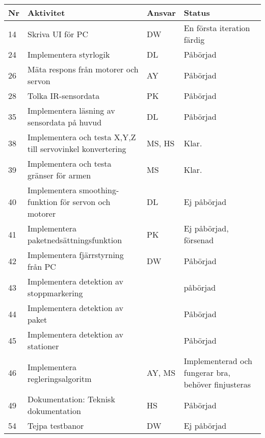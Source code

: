 \documentclass[titlepage, a4paper]{article}
\begin{document}
\newpage
\begin{center}
\begin{tabularx}{\textwidth}{| p{4mm} | X | p{13.5mm} | X |}
	\hline
	\textbf{Nr} & \textbf{Aktivitet} & \textbf{Ansvar} & \textbf{Status} \\\hline
	{14} & {Skriva UI för PC} & {DW} & {En första iteration färdig} \\\hline
	{24} & {Implementera styrlogik} & {DL} & {Påbörjad} \\\hline
	{26} & {Mäta respons från motorer och servon} & {AY} & {Påbörjad} \\\hline
	{28} & {Tolka IR-sensordata} & {PK} & {Påbörjad} \\\hline
	{35} & {Implementera läsning av sensordata på huvud} & {DL} & {Påbörjad} \\\hline
	{38} & {Implementera och testa X,Y,Z  till servovinkel konvertering} & {MS, HS} & {Klar.} \\\hline
	{39} & {Implementera och testa gränser för armen} & {MS} & {Klar.} \\\hline
	{40} & {Implementera smoothing-funktion för servon och motorer} & {DL} & {Ej påbörjad} \\\hline
	{41} & {Implementera paketnedsättningsfunktion} & {PK} & {Ej påbörjad, försenad} \\\hline
	{42} & {Implementera fjärrstyrning från PC} & {DW} & {Påbörjad} \\\hline
	{43} & {Implementera detektion av stoppmarkering} & {} & {påbörjad} \\\hline
	{44} & {Implementera detektion av paket} & {} & {Påbörjad} \\\hline
	{45} & {Implementera detektion av stationer} & {} & {Påbörjad} \\\hline
	{46} & {Implementera regleringsalgoritm} & {AY, MS} & {Implementerad och fungerar bra, behöver finjusteras} \\\hline
	{49} & {Dokumentation: Teknisk dokumentation} & {HS} & {Påbörjad} \\\hline
	{54} & {Tejpa testbanor} & {DW} & {Ej påbörjad} \\\hline
\end{tabularx}
\end{center}
\end{document}
